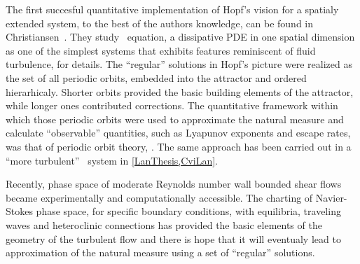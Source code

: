 The first succesful quantitative implementation of Hopf's vision for a spatialy
extended system, to the best of the authors knowledge, can be found in Christiansen~\etal{}. They study \KS\ equation, a dissipative PDE in one spatial dimension as one of the simplest systems that exhibits features reminiscent of fluid turbulence, \cf {} for details. The ``regular'' solutions in Hopf's picture were realized
as the set of all periodic orbits, embedded into the attractor and ordered hierarhicaly. Shorter
orbits provided the basic building elements of the attractor, while longer ones contributed
corrections. The quantitative framework within which those periodic orbits were used to
approximate the natural measure and calculate ``observable'' quantities, such as Lyapunov exponents and escape rates, was that of periodic orbit theory, \cf {}. The same approach has been carried out in a ``more turbulent'' \KS\ system in \ref{LanThesis,CviLan}. 

Recently, phase space of moderate Reynolds number wall bounded shear flows became experimentally and computationally accessible. The charting of Navier-Stokes phase space, for specific boundary conditions, with equilibria, traveling waves and heteroclinic connections has provided the basic
elements of the geometry of the turbulent flow and there is hope that it will eventualy lead
to approximation of the natural measure using a set of ``regular'' solutions.


